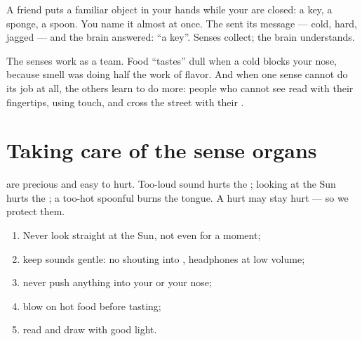 \begin{example}\label{ex:g1:the-five-senses:dark}
A friend puts a familiar object in your hands while your  are
closed: a key, a sponge, a spoon. You name it almost at once. The
 sent its message --- cold, hard, jagged --- and the brain
answered: ``a key''. Senses collect; the brain understands.
\end{example}

\begin{remark}\label{rem:g1:the-five-senses:together}
The senses work as a team. Food ``tastes'' dull when a cold blocks
your nose, because smell was doing half the work of flavor. And
when one sense cannot do its job at all, the others learn to do
more: people who cannot see read with their fingertips, using
touch, and cross the street with their .
\end{remark}

\section{Taking care of the sense organs}

\begin{proposition}\label{prop:g1:the-five-senses:fragile}
 are precious and easy to hurt. Too-loud sound hurts
the ; looking at the Sun hurts the ; a too-hot spoonful
burns the tongue. A hurt  may stay hurt --- so we
protect them.
\end{proposition}
\admitted

\begin{method}\label{met:g1:the-five-senses:protect}
\begin{enumerate}
  \item Never look straight at the Sun, not even for a moment;
  \item keep sounds gentle: no shouting into , headphones at
        low volume;
  \item never push anything into your  or your nose;
  \item blow on hot food before tasting;
  \item read and draw with good light.
\end{enumerate}
\end{method}

